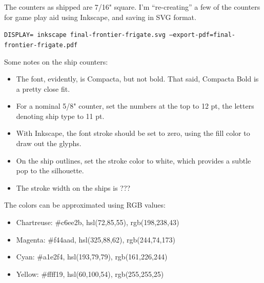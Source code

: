 \documentclass[10pt]{article}
\begin{document}
The counters as shipped are 7/16" square. I'm ``re-creating'' a few of the
counters for game play aid using Inkscape, and saving in SVG format.

{\tt DISPLAY= inkscape final-frontier-frigate.svg --export-pdf=final-frontier-frigate.pdf}

Some notes on the ship counters:

\begin{itemize}
  \item The font, evidently, is Compacta, but not bold. That said, Compacta Bold
    is a pretty close fit.
  \item For a nominal 5/8" counter, set the numbers at the top to 12 pt, the letters
    denoting ship type to 11 pt.
  \item With Inkscape, the font stroke should be set to zero, using the fill color to
    draw out the glyphs.
  \item On the ship outlines, set the stroke color to white, which provides a subtle pop
    to the silhouette.
  \item The stroke width on the ships is ???
\end{itemize}

The colors can be approximated using RGB values:

\begin{itemize}
  \item Chartreuse: \#c6ee2b, hsl(72,85,55), rgb(198,238,43)
  \item Magenta: \#f44aad, hsl(325,88,62), rgb(244,74,173)
  \item Cyan: \#a1e2f4, hsl(193,79,79), rgb(161,226,244)
  \item Yellow: \#ffff19, hsl(60,100,54), rgb(255,255,25)
\end{itemize}
\end{document}
